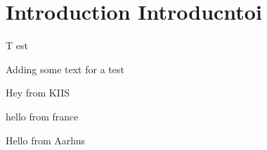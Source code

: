 

\section{Introduction Introducntoi}

\lettrine{T}{ }est
\lipsum


Adding some text for a test

Hey from KIIS

hello from france

Hello from Aarhus